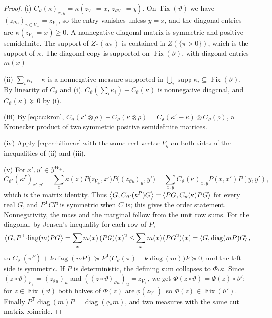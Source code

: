 \begin{proof}
(i) $C_\vartheta(\kappa)_{x,y}=\kappa(z_{V_+}=x,\ z_{\vartheta V_+}=y)$. On
$\operatorname{Fix}(\vartheta)$ we have $(z_{\vartheta u})_{u\in V_+}=z_{V_+}$, so
the entry vanishes unless $y=x$, and the diagonal entries are
$\kappa(z_{V_+}=x)\ge0$. A nonnegative diagonal matrix is symmetric and
positive semidefinite. The support of $Z_*(w\pi)$ is contained in
$Z(\{\pi>0\})$, which is the support of $\kappa$. The diagonal copy is
supported on $\operatorname{Fix}(\vartheta)$, with diagonal entries $m(x)$.

(ii) $\sum_i\kappa_i-\kappa$ is a nonnegative measure supported in
$\bigcup_i\operatorname{supp}\kappa_i\subseteq\operatorname{Fix}(\vartheta)$. By
linearity of $C_\vartheta$ and (i), $C_\vartheta(\sum_i\kappa_i)-C_\vartheta(\kappa)$
is nonnegative diagonal, and $C_\vartheta(\kappa)\succeq0$ by (i).

(iii) By \eqref{eq:cc:kron}, $C_\vartheta(\kappa'\otimes\rho)-C_\vartheta(\kappa\otimes\rho)
=C_\vartheta(\kappa'-\kappa)\otimes C_\vartheta(\rho)$, a Kronecker product of two
symmetric positive semidefinite matrices.

(iv) Apply \eqref{eq:cc:bilinear} with the same real vector $F_g$ on both sides
of the inequalities of (ii) and (iii).

(v) For $x',y'\in\mathcal Y^{W_+}$,
\[
 C_{\vartheta'}(\kappa^P)_{x',y'}
 =\sum_z\kappa(z)P\big(z_{V_+},x'\big)P\big((z_{\vartheta u})_u,y'\big)
 =\sum_{x,y}C_\vartheta(\kappa)_{x,y}P(x,x')P(y,y'),
\]
which is the matrix identity. Thus
$\left\langle G,C_{\vartheta'}(\kappa^P)G\right\rangle=\left\langle PG,C_\vartheta(\kappa)PG\right\rangle$ for every real
$G$, and $P^{\mathsf T}CP$ is symmetric when $C$ is; this gives the order
statement. Nonnegativity, the mass and the marginal follow from the unit row
sums. For the diagonal, by Jensen's inequality for each row of $P$,
\[
 \left\langle G,P^{\mathsf T}\operatorname{diag}(m)PG\right\rangle=\sum_xm(x)\,(PG)(x)^2
 \le\sum_xm(x)\,(PG^2)(x)=\left\langle G,\operatorname{diag}(mP)G\right\rangle,
\]
so $C_{\vartheta'}(\pi^P)+k\operatorname{diag}(mP)\succeq
P^{\mathsf T}\big(C_\vartheta(\pi)+k\operatorname{diag}(m)\big)P\succeq0$, and
the left side is symmetric. If $P$ is deterministic, the defining sum
collapses to $\Phi_*\kappa$. Since $(z\circ\vartheta)_{V_+}=(z_{\vartheta u})_u$
and $((z\circ\vartheta)_{\vartheta u})_u=z_{V_+}$, we get
$\Phi(z\circ\vartheta)=\Phi(z)\circ\vartheta'$; for
$z\in\operatorname{Fix}(\vartheta)$ both halves of $\Phi(z)$ are $\phi(z_{V_+})$,
so $\Phi(z)\in\operatorname{Fix}(\vartheta')$. Finally
$P^{\mathsf T}\operatorname{diag}(m)P=\operatorname{diag}(\phi_*m)$, and two
measures with the same cut matrix coincide.
\end{proof}

